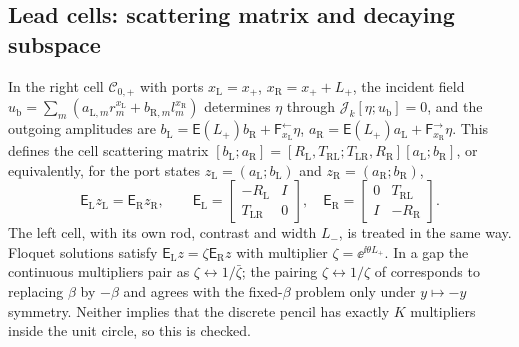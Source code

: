 \subsection{Lead cells: scattering matrix and decaying subspace}\label{sec:lead}
In the right cell $\mathcal C_{0,+}$ with ports $x_{\mathrm L}=x_+$,
$x_{\mathrm R}=x_++L_+$, the incident field
$u_{\mathrm b}=\sum_m(a_{\mathrm L,m}r_m^{x_{\mathrm L}}+b_{\mathrm R,m}l_m^{x_{\mathrm R}})$
determines $\eta$ through $\mathscr J_k[\eta;u_{\mathrm b}]=0$, and the outgoing
amplitudes are $b_{\mathrm L}=\mathsf E(L_+)b_{\mathrm R}+\mathsf F^{\leftarrow}_{x_{\mathrm L}}\eta$,
$a_{\mathrm R}=\mathsf E(L_+)a_{\mathrm L}+\mathsf F^{\rightarrow}_{x_{\mathrm R}}\eta$.
This defines the cell scattering matrix
$[b_{\mathrm L};a_{\mathrm R}]=[R_{\mathrm L},T_{\mathrm{RL}};T_{\mathrm{LR}},R_{\mathrm R}]
[a_{\mathrm L};b_{\mathrm R}]$, or equivalently, for the port states
$z_{\mathrm L}=(a_{\mathrm L};b_{\mathrm L})$ and $z_{\mathrm R}=(a_{\mathrm R};b_{\mathrm R})$,
\begin{equation}\label{eq:pencil}
  \mathsf E_{\mathrm L}z_{\mathrm L}=\mathsf E_{\mathrm R}z_{\mathrm R},\qquad
  \mathsf E_{\mathrm L}=\begin{bmatrix}-R_{\mathrm L}&I\\T_{\mathrm{LR}}&0\end{bmatrix},\quad
  \mathsf E_{\mathrm R}=\begin{bmatrix}0&T_{\mathrm{RL}}\\I&-R_{\mathrm R}\end{bmatrix}.
\end{equation}
The left cell, with its own rod, contrast and width $L_-$, is treated in the
same way. Floquet solutions satisfy $\mathsf E_{\mathrm L}z=\zeta\mathsf E_{\mathrm R}z$
with multiplier $\zeta=\ee^{\ii\theta L_+}$. In a gap the continuous
multipliers pair as $\zeta\leftrightarrow1/\bar\zeta$; the pairing
$\zeta\leftrightarrow1/\zeta$ of \cite{JolyLiFliss2006} corresponds to
replacing $\beta$ by $-\beta$ and agrees with the fixed-$\beta$ problem only
under $y\mapsto-y$ symmetry. Neither implies that the discrete pencil has
exactly $K$ multipliers inside the unit circle, so this is checked.

